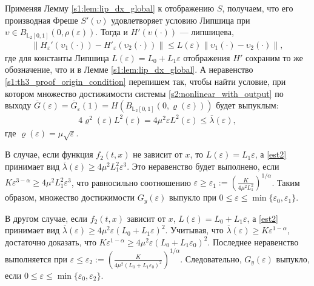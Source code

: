 \documentclass[../main.tex]{subfiles}
\begin{document}
    \doc
    Применяя Лемму \ref{s1:lem:lip_dx_global} к отображению $S$, получаем, что его производная Фреше $S'(\upsilon)$ удовлетворяет условию Липшица
    при $ \upsilon \in B_{\mathbb{L}_2[0,1]}(0,\rho(\varepsilon))  $.
    Тогда и $ H'(\upsilon(\cdot)) $ --- липшицева, 
    \begin{gather*}
        \left\| H_{\varepsilon}'(\upsilon_1(\cdot)) - H'_{\varepsilon}(\upsilon_2(\cdot)) \right\| \leqslant L(\varepsilon) \left\| \upsilon_1(\cdot) - \upsilon_2(\cdot)\right\|,
    \end{gather*}
    где для константы Липшица $ L(\varepsilon) = L_0 + L_1 \varepsilon$ отображения $ H' $ сохраним то же обозначение, что и в Лемме \ref{s1:lem:lip_dx_global}.
    А неравенство \eqref{s1:th3_proof_origin_condition} перепишем так, чтобы найти условие, при котором множество достижимости системы \eqref{s2:nonlinear_with_output} по выходу $ \overline{G}(\varepsilon) = \overline{G}_{\varepsilon}(1) = H (B_{\mathbb{L}_2[0,1]}(0,\varrho(\varepsilon)))$ будет выпуклым:
    \begin{gather}\label{est2}
        4\varrho^2(\varepsilon)L^2(\varepsilon) = 4\mu^2\varepsilon L^2(\varepsilon) \leqslant \overline{\lambda}(\varepsilon),
    \end{gather}
    где $ \varrho(\varepsilon)  = \mu\sqrt{\varepsilon} $.
    
    В случае, если функция $ f_2(t,x) $ не зависит от $ x $, то $ L(\varepsilon) = L_1 \varepsilon  $, а \eqref{est2} принимает вид $ \overline{\lambda}(\varepsilon) \geqslant 4\mu^2L_1^2 \varepsilon^3 $.  Это неравенство будет выполнено, если $ K\varepsilon^{3 - \alpha} \geqslant 4\mu^2L_1^2 \varepsilon^3 $, что равносильно соотношению $ \varepsilon \geqslant \varepsilon_1 := \left(\frac{K}{4\mu^2L_1^2}\right)^{1/\alpha} $.  Таким образом, множество достижимости $ G_y(\varepsilon)$ выпукло при $ 0 \leqslant \varepsilon \leqslant \min\{\varepsilon_0,\varepsilon_1\}  $.  
    
    В другом случае, если $ f_2(t,x) $ зависит от $ x $, $ L(\varepsilon) =L_0+L_1\varepsilon $, а \eqref{est2} принимает вид $ \overline{\lambda}(\varepsilon) \geqslant 4\mu^2 \varepsilon (L_0 + L_1 \varepsilon)^2 $.  Учитывая, что $ \overline{\lambda}(\varepsilon)  \geqslant K \varepsilon^{1-\alpha} $, достаточно доказать, что $ K \varepsilon^{1-\alpha}  \geqslant 4\mu^2 \varepsilon (L_0 + L_1 \varepsilon_0)^2 $. Последнее неравенство выполняется при $ \varepsilon \leqslant \varepsilon_2 := \left(\frac{K}{4\mu^2(L_0 + L_1\varepsilon_0)^2} \right)^{1/\alpha} $. Следовательно, $ G_y(\varepsilon) $ выпукло, если $ 0 \leqslant \varepsilon \leqslant \min\{\varepsilon_0, \varepsilon_2\} $.
    
\end{document}
